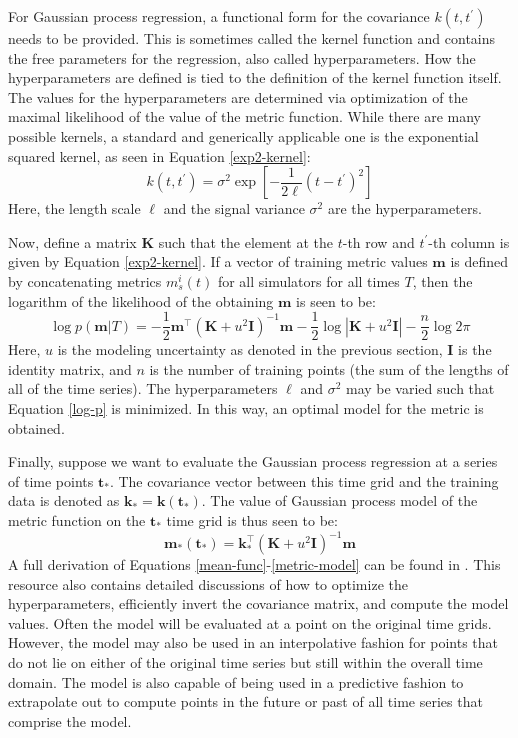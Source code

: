 \documentclass{ntmanuscript}
\newcommand{\I}{\mathbf{I}}
\newcommand{\K}{\mathbf{K}}
\begin{document}
For Gaussian process regression, a functional form for the covariance
$k(t, t^\prime)$ needs to be provided.
This is sometimes called the kernel function and contains the free parameters
for the regression, also called hyperparameters. How the hyperparameters are
defined is
tied to the definition of the kernel function itself. The values for the
hyperparameters are determined
via optimization of the maximal likelihood of the value of the metric function.
While there are many possible kernels, a standard and generically applicable one
is the exponential squared kernel, as seen in Equation \ref{exp2-kernel}:
\begin{equation}
\label{exp2-kernel}
k(t, t^\prime) = \sigma^2 \exp\left[-\frac{1}{2\ell}(t - t^\prime)^2 \right]
\end{equation}
Here, the length scale $\ell$ and the signal variance $\sigma^2$ are the
hyperparameters.

Now, define a matrix $\K$ such that the element at the $t$-th row and $t^\prime$-th
column is given by Equation \ref{exp2-kernel}. If a vector of training metric
values $\mathbf{m}$ is defined by concatenating metrics $m_s^i(t)$ for all
simulators
for all times $T$, then the logarithm of the likelihood of the obtaining
$\mathbf{m}$ is seen to be:
\begin{equation}
\label{log-p}
\log p(\mathbf{m}|T) = -\frac{1}{2}\mathbf{m}^\top\left(\K + u^2\I\right)^{-1}\mathbf{m}
                       -\frac{1}{2}\log\left|\K + u^2\I\right|
                       -\frac{n}{2}\log 2\pi
\end{equation}
Here, $u$ is the modeling uncertainty as denoted in the previous section,
$\I$ is the identity matrix, and $n$ is the number of training points (the
sum of the lengths of all of the time series). The hyperparameters $\ell$ and
$\sigma^2$ may be varied such that Equation \ref{log-p} is minimized.
In this way, an optimal model for the metric is obtained.

Finally, suppose we want to evaluate the Gaussian process regression at a
series of time points $\mathbf{t_*}$.
The covariance vector between this time grid and the training data is denoted
as $\mathbf{k}_* = \mathbf{k}(\mathbf{t_*})$. The value of Gaussian process
model of the metric function on the $\mathbf{t_*}$ time grid is thus seen to be:
\begin{equation}
\label{metric-model}
\mathbf{m}_*(\mathbf{t}_*) = \mathbf{k}_*^\top \left(\K + u^2\I\right)^{-1}\mathbf{m}
\end{equation}
A full derivation of Equations \ref{mean-func}-\ref{metric-model} can be found in
\cite{rasmussen2006gaussian}. This resource also contains detailed discussions of
how to optimize the hyperparameters, efficiently invert the covariance
matrix, and compute the model values. Often the model will be evaluated at
a point on the original time grids. However, the model may also be used in an
interpolative fashion for points that do not lie on either of the original
time series but still within the overall time domain. The model is also capable
of being used in a predictive fashion to extrapolate out to compute points in
the future or past of all time series that comprise the model.
\end{document}
